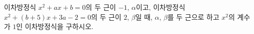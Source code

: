 이차방정식 $x^2+ax+b=0$의 두 근이 $-1$, $\alpha$이고, 이차방정식 $x^2+(b+5)x+3a-2=0$의 두 근이 $2$, $\beta$일 때, $\alpha$, $\beta$를 두 근으로 하고 $x^2$의 계수가 $1$인 이차방정식을 구하시오. 
